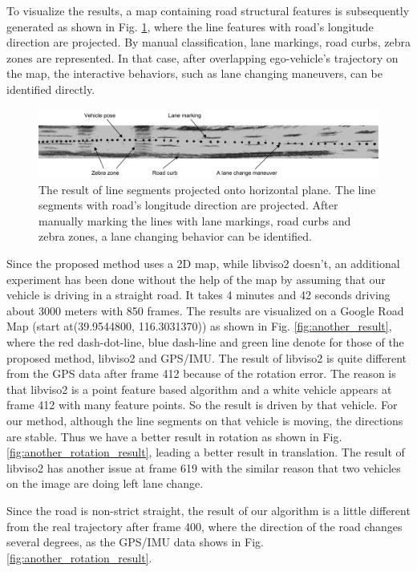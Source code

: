 \documentclass[letterpaper, 10 pt, conference]{ieeeconf}  %
\begin{document}
To visualize the results, a map containing road structural features is subsequently generated as shown in Fig. \ref{fig:lineProjection}, where the line features with road's longitude direction are projected. By manual classification, lane markings, road curbs, zebra zones are represented. In that case, after overlapping ego-vehicle's trajectory on the map, the interactive behaviors, such as lane changing maneuvers, can be identified directly.
\begin{figure}
\centering
\includegraphics[width=1\linewidth]{source//Final//horizon_line.pdf}
\caption{The result of line segments projected onto horizontal plane. The line segments with road's longitude direction are projected. After manually marking the lines with lane markings, road curbs and zebra zones, a lane changing behavior can be identified.}
\label{fig:lineProjection}
\end{figure}

Since the proposed method uses a 2D map, while libviso2 doesn't, an additional experiment has been done without the help of the map by assuming that our vehicle is driving in a straight road. It takes 4 minutes and 42 seconds driving about 3000 meters with 850 frames. The results are visualized on a Google Road Map (start at(39.9544800, 116.3031370)) as shown in Fig. \ref{fig:another_result}, where the red dash-dot-line, blue dash-line and green line denote for those of the proposed method, libviso2 and GPS/IMU. The result of libviso2 is quite different from the GPS data after frame 412 because of the rotation error. The reason is that libviso2 is a point feature based algorithm and a white vehicle appears at frame 412 with many feature points. So the result is driven by that vehicle. For our method, although the line segments on that vehicle is moving, the directions are stable. Thus we have a better result in rotation as shown in Fig. \ref{fig:another_rotation_result}, leading a better result in translation. The result of libviso2 has another issue at frame 619 with the similar reason that two vehicles on the image are doing left lane change.
 
Since the road is non-strict straight, the result of our algorithm is a little different from the real trajectory after frame 400, where the direction of the road changes several degrees, as the GPS/IMU data shows in Fig. \ref{fig:another_rotation_result}.
\end{document}
